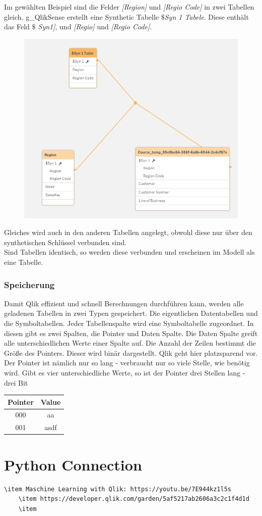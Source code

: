 Im gewählten Beispiel sind die Felder \textit{[Region]} und \textit{[Regio Code]} in zwei Tabellen gleich. \gls{g_QlikSense} erstellt eine Synthetic Tabelle \textit{$\$$Syn 1 Tabele}. Diese enthält das Feld \textit{$\$$ Syn1]}, und \textit{[Regio]} und \textit{[Regio Code]}. 
\begin{figure}[H]
	\centering
	\includegraphics[scale = 0.3]{attachment/chapter_3/Scc027}
	\caption{}
	\label{fig:Scc027}
\end{figure}
Gleiches wird auch in den anderen Tabellen angelegt, obwohl diese nur über den synthetischen Schlüssel verbunden sind.\\
Sind Tabellen identisch, so werden diese verbunden und erscheinen im Modell als eine Tabelle. 
\subsubsection{Speicherung}
Damit Qlik effizient und schnell Berechnungen durchführen kann, werden alle geladenen Tabellen in zwei Typen gespeichert. Die eigentlichen Datentabellen und die Symboltabellen. Jeder Tabellenspalte wird eine Symboltabelle zugeordnet. In diesen gibt es zwei Spalten, die Pointer und Daten Spalte. Die Daten Spalte greift alle unterschiedlichen Werte einer Spalte auf. Die Anzahl der Zeilen bestimmt die Größe des Pointers. Dieser wird binär dargestellt. Qlik geht hier platzsparend vor. Der Pointer ist nämlich nur so lang - verbraucht nur so viele Stelle, wie benötig wird. Gibt es vier unterschiedliche Werte, so ist der Pointer drei Stellen lang - drei Bit
\begin{table}
	\centering 
	\begin{tabular}{cc}
		Pointer & Value \\ \hline
		000 & aa\\ 
		001 & asdf\\ 
	\end{tabular} 
\end{table}  

\section{Python Connection}
\begin{lstlisting}[style=python]
	\item Maschine Learning with Qlik: https://youtu.be/7E944kz1l5s
	\item https://developer.qlik.com/garden/5af5217ab2606a3c2c1f4d1d
	\item 
\end{lstlisting}
